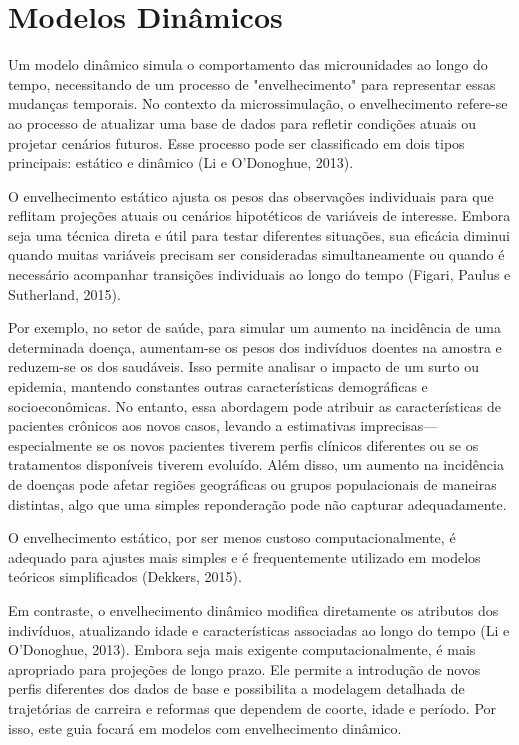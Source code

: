 \documentclass[12pt]{article}
\theoremstyle{break}
\begin{document}
\section{Modelos Dinâmicos}\label{sec:model_din}
Um modelo dinâmico simula o comportamento das microunidades ao longo do tempo, necessitando de um processo de "envelhecimento" para representar essas mudanças temporais. No contexto da microssimulação, o envelhecimento refere-se ao processo de atualizar uma base de dados para refletir condições atuais ou projetar cenários futuros. Esse processo pode ser classificado em dois tipos principais: estático e dinâmico (Li e O'Donoghue, 2013).

O envelhecimento estático ajusta os pesos das observações individuais para que reflitam projeções atuais ou cenários hipotéticos de variáveis de interesse. Embora seja uma técnica direta e útil para testar diferentes situações, sua eficácia diminui quando muitas variáveis precisam ser consideradas simultaneamente ou quando é necessário acompanhar transições individuais ao longo do tempo (Figari, Paulus e Sutherland, 2015).

Por exemplo, no setor de saúde, para simular um aumento na incidência de uma determinada doença, aumentam-se os pesos dos indivíduos doentes na amostra e reduzem-se os dos saudáveis. Isso permite analisar o impacto de um surto ou epidemia, mantendo constantes outras características demográficas e socioeconômicas. No entanto, essa abordagem pode atribuir as características de pacientes crônicos aos novos casos, levando a estimativas imprecisas—especialmente se os novos pacientes tiverem perfis clínicos diferentes ou se os tratamentos disponíveis tiverem evoluído. Além disso, um aumento na incidência de doenças pode afetar regiões geográficas ou grupos populacionais de maneiras distintas, algo que uma simples reponderação pode não capturar adequadamente.

O envelhecimento estático, por ser menos custoso computacionalmente, é adequado para ajustes mais simples e é frequentemente utilizado em modelos teóricos simplificados (Dekkers, 2015).

Em contraste, o envelhecimento dinâmico modifica diretamente os atributos dos indivíduos, atualizando idade e características associadas ao longo do tempo (Li e O’Donoghue, 2013). Embora seja mais exigente computacionalmente, é mais apropriado para projeções de longo prazo. Ele permite a introdução de novos perfis diferentes dos dados de base e possibilita a modelagem detalhada de trajetórias de carreira e reformas que dependem de coorte, idade e período. Por isso, este guia focará em modelos com envelhecimento dinâmico.
\end{document}
